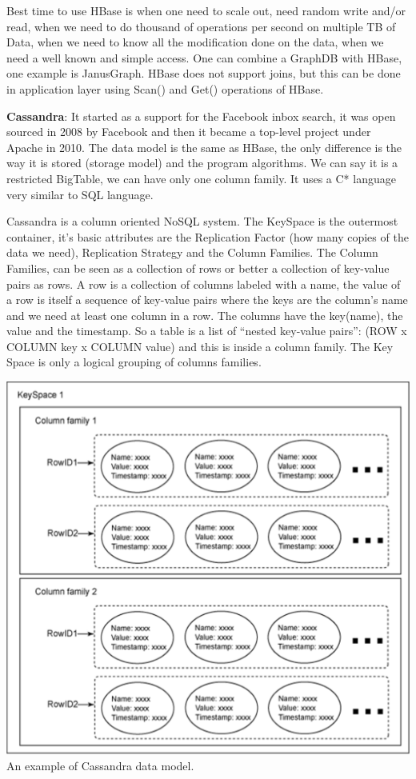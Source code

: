 \documentclass[a4page, 11pt]{article}
\begin{document}
Best time to use HBase is when one need to scale out, need random write and/or read, when we need to do thousand of operations per second on multiple TB of Data, when we need to know all the modification done on
the data, when we need a well known and simple access. One can combine a GraphDB with HBase, one example is JanusGraph.
HBase does not support joins, but this can be done in application layer using Scan() and Get() operations of HBase.

\textbf{Cassandra\cite{Cassandra}}: It started as a support for the Facebook inbox search, it was open sourced in 2008 by Facebook and then it became a top-level project under Apache in 2010. The data model is the same as HBase, the only difference is the way it is stored (storage model) and the program algorithms. We can say it is a restricted BigTable, we can have only one column family. It uses a C* language very similar to SQL language.

Cassandra is a column oriented NoSQL system. 
The KeySpace is the outermost container, it's basic attributes are the Replication Factor (how many copies of the data we need), Replication Strategy and the Column Families.
The Column Families, can be seen as a collection of rows or better a collection of key-value pairs as rows. 
A row is a collection of columns labeled with a name, the value of a row is itself a sequence of key-value pairs where the keys are the column's name and we need at least one column in a row. The columns have the key(name), the value and the timestamp. So a table is a list of “nested key-value pairs”: (ROW x COLUMN key x COLUMN value) and this is inside a column family.
The Key Space is only a logical grouping of columns families.

\begin{center}
	\includegraphics[scale=0.5]{IMAGE5.png}\\
	An example of Cassandra data model.
\end{center}
\end{document}
